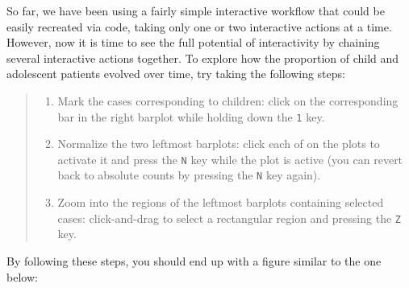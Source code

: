 \documentclass[
]{book}
\providecommand{\tightlist}{%
  \setlength{\itemsep}{0pt}\setlength{\parskip}{0pt}}
\theoremstyle{definition}
\theoremstyle{definition}
\theoremstyle{definition}
\theoremstyle{definition}
\theoremstyle{remark}
\begin{document}
So far, we have been using a fairly simple interactive workflow that could be easily recreated via code, taking only one or two interactive actions at a time. However, now it is time to see the full potential of interactivity by chaining several interactive actions together. To explore how the proportion of child and adolescent patients evolved over time, try taking the following steps:

\begin{quote}
\begin{enumerate}
\def\labelenumi{\arabic{enumi}.}
\tightlist
\item
  Mark the cases corresponding to children: click on the corresponding bar in the right barplot while holding down the \texttt{1} key.
\item
  Normalize the two leftmost barplots: click each of on the plots to activate it and press the \texttt{N} key while the plot is active (you can revert back to absolute counts by pressing the \texttt{N} key again).
\item
  Zoom into the regions of the leftmost barplots containing selected cases: click-and-drag to select a rectangular region and pressing the \texttt{Z} key.
\end{enumerate}
\end{quote}

By following these steps, you should end up with a figure similar to the one below:
\end{document}
